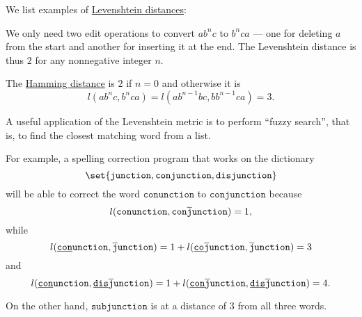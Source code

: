 \begin{example}\label{ex:def:levenshtein_distance}
  We list examples of \hyperref[def:levenshtein_distance]{Levenshtein distances}:
  \begin{thmenum}
     We only need two edit operations to convert \( a b^n c \) to \( b^n c a \) --- one for deleting \( a \) from the start and another for inserting it at the end. The Levenshtein distance is thus \( 2 \) for any nonnegative integer \( n \).

    The \hyperref[def:hamming_distance]{Hamming distance} is \( 2 \) if \( n = 0 \) and otherwise it is
    \begin{equation*}
      l(a b^n c, b^n c a) = l(a b^{n-1} b c, b b^{n-1} c a) = 3.
    \end{equation*}

     A useful application of the Levenshtein metric is to perform \enquote{fuzzy search}, that is, to find the closest matching word from a list.

    For example, a spelling correction program that works on the dictionary
    \begin{equation*}
      \set{ \texttt{junction}, \texttt{conjunction}, \texttt{disjunction} }
    \end{equation*}
    will be able to correct the word \( \texttt{conunction} \) to \( \texttt{conjunction} \) because
    \begin{equation*}
      l(\texttt{conunction}, \texttt{con}\oline{\texttt{j}}\texttt{unction}) = 1,
    \end{equation*}
    while
    \begin{equation*}
      l(\hi{\texttt{con}}\texttt{unction}, \oline{\texttt{j}}\texttt{unction}) = 1 + l(\hi{\texttt{co}}\oline{\texttt{j}}\texttt{unction}, \oline{\texttt{j}}\texttt{unction}) = 3
    \end{equation*}
    and
    \begin{equation*}
      l(\hi{\texttt{con}}\texttt{unction}, \hi{\texttt{dis}}\oline{\texttt{j}}\texttt{unction}) = 1 + l(\hi{\texttt{con}}\oline{\texttt{j}}\texttt{unction}, \hi{\texttt{dis}}\oline{\texttt{j}}\texttt{unction}) = 4.
    \end{equation*}

    On the other hand, \( \texttt{subjunction} \) is at a distance of \( 3 \) from all three words.
  \end{thmenum}
\end{example}

